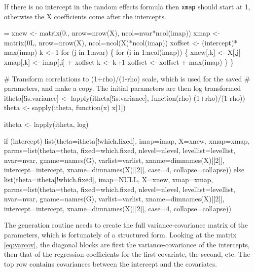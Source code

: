 \documentclass{article}
\begin{document}
If there is no intercept in the random effects formula then \Verb!xmap! should
start at 1, otherwise the X coefficients come after the intercepts.
\begin{nwchunk}
=
 xnew <- matrix(0., nrow=nrow(X), ncol=nvar*ncol(imap))
 xmap <- matrix(0L, nrow=nrow(X), ncol=ncol(X)*ncol(imap))
 xoffset <- (intercept)* max(imap)
 k <- 1
 for (j in 1:nvar) \{
     for (i in 1:ncol(imap)) \{ 
         xnew[,k] <- X[,j]
         xmap[,k] <- imap[,i] + xoffset
         k <- k+1
         xoffset <- xoffset + max(imap)
         \}
     \}
 
 # Transform correlations to (1+rho)/(1-rho) scale, which is used for the saved
 #  parameters, and make a copy.  The initial parameters are then log transformed
 itheta[!is.variance] <- lapply(itheta[!is.variance], function(rho) (1+rho)/(1-rho))
 theta <- sapply(itheta, function(x) x[1])
 
 itheta <- lapply(itheta, log)
 
 if (intercept)
     list(theta=itheta[!which.fixed], imap=imap, X=xnew, xmap=xmap, 
              parms=list(theta=theta, fixed=which.fixed, 
                         nlevel=nlevel, levellist=levellist,
                         nvar=nvar, gname=names(G), varlist=varlist,
                         xname=dimnames(X)[[2]], intercept=intercept,
                         xname=dimnames(X)[[2]], case=4, collapse=collapse))
 else list(theta=itheta[!which.fixed], imap=NULL, X=xnew, xmap=xmap, 
              parms=list(theta=theta, fixed=which.fixed, 
                         nlevel=nlevel, levellist=levellist,
                         nvar=nvar, gname=names(G), varlist=varlist,
                         xname=dimnames(X)[[2]], intercept=intercept,
                         xname=dimnames(X)[[2]], case=4, collapse=collapse))
\end{nwchunk}


The generation routine needs to create the full variance-covariance
matrix of the parameters,
which is fortunately of a structured form.
Looking at the matrix \ref{eq:varcov}, the diagonal blocks are first
the variance-covariance of the intercepts, then that of the regression
coefficients for the first covariate, the second, etc.
The top row contains covariances between the intercept and the 
covariates.
\end{document}
